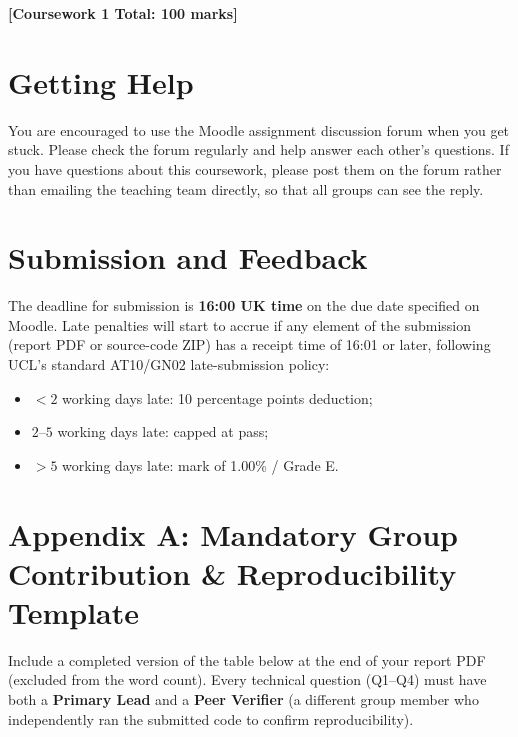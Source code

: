 \documentclass[11pt,a4paper]{article}
\begin{document}
\bigskip
\begin{center}
    \textbf{[Coursework 1 Total: 100 marks]}
\end{center}

\section*{Getting Help}
You are encouraged to use the Moodle assignment discussion forum when you get stuck. Please check the forum regularly and help answer each other's questions. If you have questions about this coursework, please post them on the forum rather than emailing the teaching team directly, so that all groups can see the reply.

\section*{Submission and Feedback}
The deadline for submission is \textbf{16:00 UK time} on the due date specified on Moodle. Late penalties will start to accrue if any element of the submission (report PDF or source-code ZIP) has a receipt time of 16:01 or later, following UCL's standard AT10/GN02 late-submission policy:
\begin{itemize}[leftmargin=1.5em, itemsep=0.15em]
    \item $< 2$ working days late: 10 percentage points deduction;
    \item $2$--$5$ working days late: capped at pass;
    \item $> 5$ working days late: mark of 1.00\% / Grade E.
\end{itemize}

\newpage
\thispagestyle{endpage}
\section*{Appendix A: Mandatory Group Contribution \& Reproducibility Template}
Include a completed version of the table below at the end of your report PDF (excluded from the word count). Every technical question (Q1--Q4) must have both a \textbf{Primary Lead} and a \textbf{Peer Verifier} (a different group member who independently ran the submitted code to confirm reproducibility).
\end{document}
